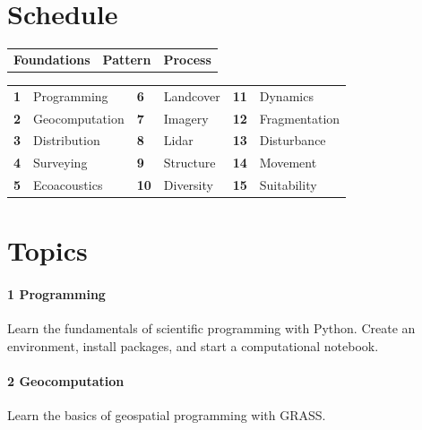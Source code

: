 \documentclass[11pt,article,oneside]{memoir}
\begin{document}

\section{Schedule}

\begin{table}[H]
\begin{tabular}{@{} l @{\hskip 11.8em} l @{\hskip 10.8em} l}
\textbf{Foundations} & \textbf{Pattern} & \textbf{Process}\\
\end{tabular}
\end{table}

\vspace*{-1em}

\begin{table}[H]
\small
\begin{tabular}{@{} l l l l l l}
\small
\textbf{1} & Programming \hspace{7em} & \textbf{6} & Landcover \hspace{7em} & \textbf{11} & Dynamics \\
\textbf{2} & Geocomputation & \textbf{7} & Imagery & \textbf{12} & Fragmentation \\
\textbf{3} & Distribution & \textbf{8} & Lidar & \textbf{13} & Disturbance \\
\textbf{4} & Surveying & \textbf{9} & Structure & \textbf{14} & Movement \\
\textbf{5} & Ecoacoustics & \textbf{10} & Diversity & \textbf{15} & Suitability \\
\end{tabular}
\end{table}

\clearpage


\section{Topics}

\paragraph{1 Programming} Learn the fundamentals of scientific programming with Python. Create an environment, install packages, and start a computational notebook.\dotfill

\paragraph{2 Geocomputation} Learn the basics of geospatial programming with GRASS.\dotfill
\end{document}
